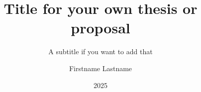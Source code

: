 \title{Title for your own thesis or proposal}
\subtitle{A subtitle if you want to add that}
\author{Firstname Lastname}
\date{2025}
\subject{Informatics} %




\thesissummary{\lipsum[1]}
